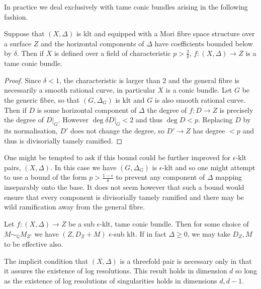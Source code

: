 \documentclass[a4paper,12pt]{book}
\begin{document}
In practice we deal exclusively with tame conic bundles arising in the following fashion.

\begin{lemma}\label{S2}
	Suppose that $(X,\Delta)$ is klt and equipped with a Mori fibre space structure over a surface $Z$ and the horizontal components of $\Delta$ have coefficients bounded below by $\delta$. Then if $X$ is defined over a field of characteristic $p > \frac{2}{\delta}$, $f\colon (X,\Delta) \to Z$ is a tame conic bundle.
\end{lemma}
\begin{proof}
	
	Since $\delta <1$, the characteristic is larger than $2$ and the general fibre is necessarily a smooth rational curve, in particular $X$ is a conic bundle. Let $G$ be the generic fibre, so that $(G,\Delta_{G})$ is klt and $G$ is also smooth rational curve. Then if $D$ is some horizontal component of $\Delta$ the degree of $f\colon D \to Z$ is precisely the degree of $D|_{G}$. However $\deg \delta D|_{G} <2$ and thus $\deg D < p$. Replacing $D$ by its normalisation, $D'$ does not change the degree, so $D'\to Z$ has degree $<p$ and thus is divisorially tamely ramified.
\end{proof}

\begin{remark}
	One might be tempted to ask if this bound could be further improved for $\epsilon$-klt pairs, $(X,\Delta)$. In this case we have $(G,\Delta_{G})$ is $\epsilon$-klt and so one might attempt to use a bound of the form $p > \frac{1-\epsilon}{\delta}$ to prevent any component of $\Delta$ mapping inseparably onto the base. It does not seem however that such a bound would ensure that every component is divisorially tamely ramified and there may be wild ramification away from the general fibre. 
\end{remark}

\begin{theorem}\label{cbf}
	Let $f\colon (X,\Delta) \to Z$ be a sub $\epsilon$-klt, tame conic bundle. Then for some choice of $M\sim_{\mathbb{Q}} M_{Z'}$ we have $(Z,D_{Z}+M)$ $\epsilon$-sub klt. If in fact $\Delta \geq 0$, we may take $D_{Z},M$ to be effective also.
\end{theorem}
\begin{remark}
	The implicit condition that $(X,\Delta)$ is a threefold pair is necessary only in that it assures the existence of log resolutions. This result holds in dimension $d$ so long as the existence of log resolutions of singularities holds in dimensions $d,d-1$.
\end{remark}
\end{document}
